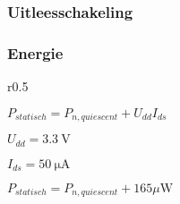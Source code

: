 \begin{frame}
    \frametitle{Uitleesschakeling}
    


\end{frame}

\begin{frame}
    \frametitle{Energie}

    \begin{wrapfigure}{r}{0.5\textwidth}
        \centering
        \def\svgwidth{0.5\textwidth}
        
    \end{wrapfigure}
    
    $P_{statisch} = P_{n,quiescent} + U_{dd}I_{ds}$
    \pause
    \vspace{1cm}

    $U_{dd}=\qty{3.3}{\volt}$

    $I_{ds}=\qty{50}{\micro\ampere}$
    \pause

    $P_{statisch} = P_{n,quiescent} + 165\mu\mathrm{W}$
\end{frame}